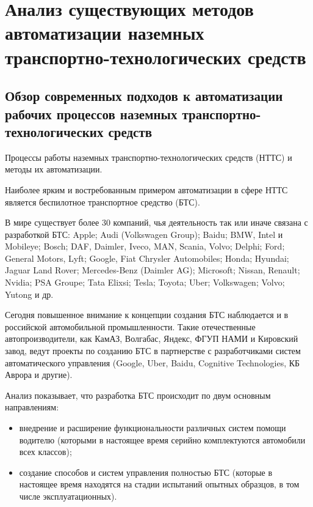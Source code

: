 \chapter{Анализ существующих методов автоматизации наземных транспортно-технологических средств}\label{ch:ch1}

\section{Обзор современных подходов к автоматизации рабочих процессов наземных транспортно-технологических средств}\label{sec:ch1/sec1}

Процессы работы наземных транспортно-технологических средств (НТТС) и методы их автоматизации.

Наиболее ярким и востребованным примером автоматизации в сфере НТТС является беспилотное транспортное средство (БТС).

В мире существует более 30 компаний, чья деятельность так или иначе связана с разработкой БТС: Apple; Audi (Volkswagen Group); Baidu; BMW, Intel и Mobileye; Bosch; DAF, Daimler, Iveco, MAN, Scania, Volvo; Delphi; Ford; General Motors, Lyft; Google, Fiat Chrysler Automobiles; Honda; Hyundai; Jaguar Land Rover; Mercedes-Benz (Daimler AG); Microsoft; Nissan, Renault; Nvidia; PSA Groupe; Tata Elixsi; Tesla; Toyota; Uber; Volkswagen; Volvo; Yutong и др.

Сегодня повышенное внимание к концепции создания БТС наблюдается и в российской автомобильной промышленности. Такие отечественные автопроизводители, как КамАЗ, Волгабас, Яндекс, ФГУП НАМИ и Кировский завод, ведут проекты по созданию БТС в партнерстве с разработчиками систем автоматического управления (Google, Uber, Baidu, Cognitive Technologies, КБ Аврора и другие).

Анализ показывает, что разработка БТС происходит по двум основным направлениям:

\begin{itemize}
    \item внедрение и расширение функциональности различных систем помощи водителю (которыми в настоящее время серийно комплектуются автомобили всех классов);
    \item создание способов и систем управления полностью БТС (которые в настоящее время находятся на стадии испытаний опытных образцов, в том числе эксплуатационных).
\end{itemize}

